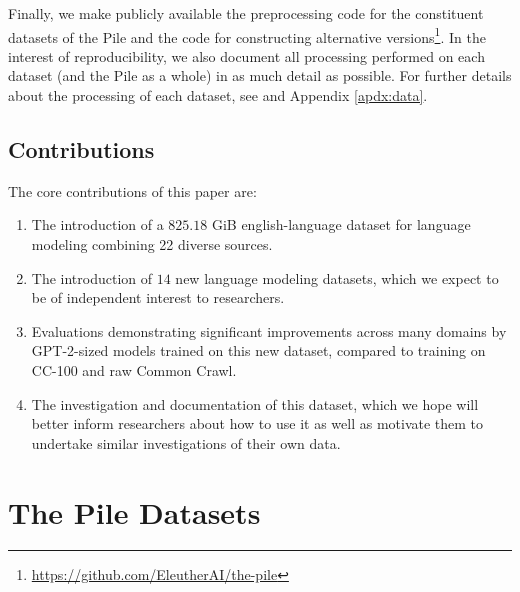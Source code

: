 \documentclass[11pt,a4paper]{article}
\begin{document}
Finally, we make publicly available the preprocessing code for the constituent datasets of the Pile and the code for constructing alternative versions\footnote{\url{https://github.com/EleutherAI/the-pile}}. In the interest of reproducibility, we also document all processing performed on each dataset (and the Pile as a whole) in as much detail as possible. For further details about the processing of each dataset, see  and Appendix \ref{apdx:data}.

\subsection{Contributions}

The core contributions of this paper are:

\begin{enumerate}
    \item The introduction of a $825.18$ GiB english-language dataset for language modeling combining 22 diverse sources. 
    \item The introduction of $14$ new language modeling datasets, which we expect to be of independent interest to researchers.
    \item Evaluations demonstrating significant improvements across many domains by GPT-2-sized models trained on this new dataset, compared to training on CC-100 and raw Common Crawl.
    \item The investigation and documentation of this dataset, which we hope will better inform researchers about how to use it as well as motivate them to undertake similar investigations of their own data.
\end{enumerate}




\section{The Pile Datasets}\label{sec:data}
\end{document}
